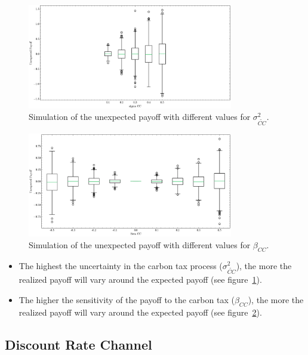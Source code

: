 \begin{figure}[htbp]
    \centering
    \includegraphics[width=0.8\textwidth]{../images/chapter01/unexpected_payoff_boxplot.png}
    \caption{Simulation of the unexpected payoff with different values for $\sigma_{\tilde{CC}}^2$.}
    \label{fig:payoff}
\end{figure}

\begin{figure}[htbp]
    \centering
    \includegraphics[width=0.8\textwidth]{../images/chapter01/unexpected_payoff_beta_cc.png}
    \caption{Simulation of the unexpected payoff with different values for $\beta_{CC}$.}
    \label{fig:payoff_beta}
\end{figure}



\begin{itemize}
    \item The highest the uncertainty in the carbon tax process ($\sigma_{\tilde{CC}}^2$),
    the more the realized payoff will vary around the expected payoff (see figure~\ref{fig:payoff}).
    \item The higher the sensitivity of the payoff to the carbon tax ($\beta_{CC}$),
    the more the realized payoff will vary around the expected payoff (see figure~\ref{fig:payoff_beta}).    
\end{itemize}




\subsection{Discount Rate Channel}

